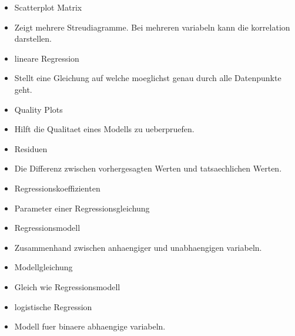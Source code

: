 \documentclass[
]{article}
\providecommand{\tightlist}{%
  \setlength{\itemsep}{0pt}\setlength{\parskip}{0pt}}
\begin{document}
\begin{itemize}
\tightlist
\item
  Scatterplot Matrix
\item
  Zeigt mehrere Streudiagramme. Bei mehreren variabeln kann die
  korrelation darstellen.
\item
  lineare Regression
\item
  Stellt eine Gleichung auf welche moeglichst genau durch alle
  Datenpunkte geht.
\item
  Quality Plots
\item
  Hilft die Qualitaet eines Modells zu ueberpruefen.
\item
  Residuen
\item
  Die Differenz zwischen vorhergesagten Werten und tatsaechlichen
  Werten.
\item
  Regressionskoeffizienten
\item
  Parameter einer Regressionsgleichung
\item
  Regressionsmodell
\item
  Zusammenhand zwischen anhaengiger und unabhaengigen variabeln.
\item
  Modellgleichung
\item
  Gleich wie Regressionsmodell
\item
  logistische Regression
\item
  Modell fuer binaere abhaengige variabeln.
\end{itemize}
\end{document}
